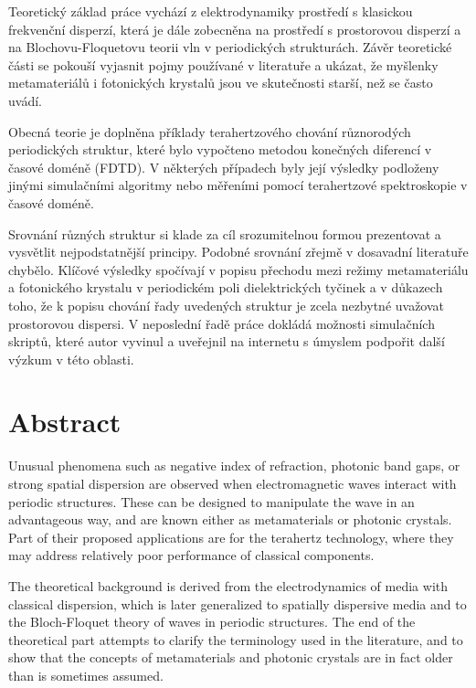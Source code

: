 Teoretický základ práce vychází z elektrodynamiky prostředí s klasickou frekvenční disperzí, která je dále zobecněna na prostředí s prostorovou disperzí a na Blochovu-Floquetovu teorii vln v periodických strukturách. Závěr teoretické části se pokouší vyjasnit pojmy používané v literatuře a ukázat, že myšlenky metamateriálů i fotonických krystalů jsou ve skutečnosti starší, než se často uvádí.

Obecná teorie je doplněna příklady terahertzového chování různorodých periodických struktur, které bylo vypočteno metodou konečných diferencí v časové doméně (FDTD). V některých případech byly její výsledky podloženy jinými simulačními algoritmy nebo měřeními pomocí terahertzové spektroskopie v časové doméně.

Srovnání  různých struktur si klade za cíl srozumitelnou formou prezentovat a vy\-svět\-lit nej\-pod\-stat\-něj\-ší principy. Podobné srov\-nání zřejmě v dosavadní literatuře chy\-bě\-lo. Klíčové vý\-sledky spočí\-vají v popisu přechodu mezi režimy metamateriálu a fotonického krystalu v periodickém poli dielektrických tyčinek a v důkazech toho, že k popisu chování řady uvedených struktur je zcela nezbytné uvažovat prostorovou dispersi. V neposlední řadě práce dokládá možnosti simulačních skriptů, které autor vyvinul a uveřejnil na internetu s úmyslem podpořit další výzkum v této oblasti. 

\vspace{0mm}
{\let\clearpage\relax\chapter*{Abstract}}
\noindent
Unusual phenomena such as negative index of refraction, photonic band gaps, or strong spatial dispersion are observed when electromagnetic waves interact with periodic structures. These can be designed to manipulate the wave in an advantageous way, and are known either as metamaterials or photonic crystals. Part of their proposed applications are for the terahertz technology, where they may address relatively poor performance of classical components.

The theoretical background is derived from the electrodynamics of media with classical dispersion, which is later generalized to spatially dispersive media and to the Bloch-Floquet theory of waves in periodic structures. The end of the theoretical part attempts to clarify the terminology used in the literature, and to show that the concepts of metamaterials and photonic crystals are in fact older than is sometimes assumed.

